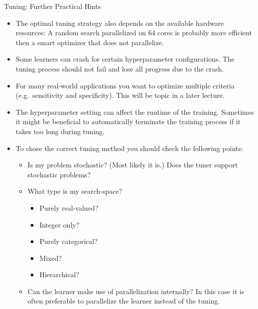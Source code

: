 \begin{frame}[allowframebreaks]{Tuning: Further Practical Hints}
\begin{itemize}
  \item The optimal tuning strategy also depends on the available hardware  resources: A random search parallelized on 64 cores is probably more efficient then a smart optimizer that does not parallelize.
  \item Some learners can crash for certain hyperparameter configurations. The tuning process should not fail and lose all progress due to the crash.
  \item For many real-world applications you want to optimize multiple criteria (e.g.\ sensitivity and specificity). This will be topic in a later lecture.
  \item The hyperparameter setting can affect the runtime of the training. Sometimes it might be beneficial to automatically terminate the training process if it takes too long during tuning.
  \item To chose the correct tuning method you should check the following points:
  \begin{itemize}
    \item Is my problem stochastic? (Most likely it is.) Does the tuner support stochastic problems?
    \item What type is my search-space?
      \begin{itemize}
        \item Purely real-valued?
        \item Integer only?
        \item Purely categorical?
        \item Mixed?
        \item Hierarchical?
      \end{itemize}
    \item Can the learner make use of parallelization internally? In this case it is often preferable to parallelize the learner instead of the tuning.
  \end{itemize}
\end{itemize}
\end{frame}


